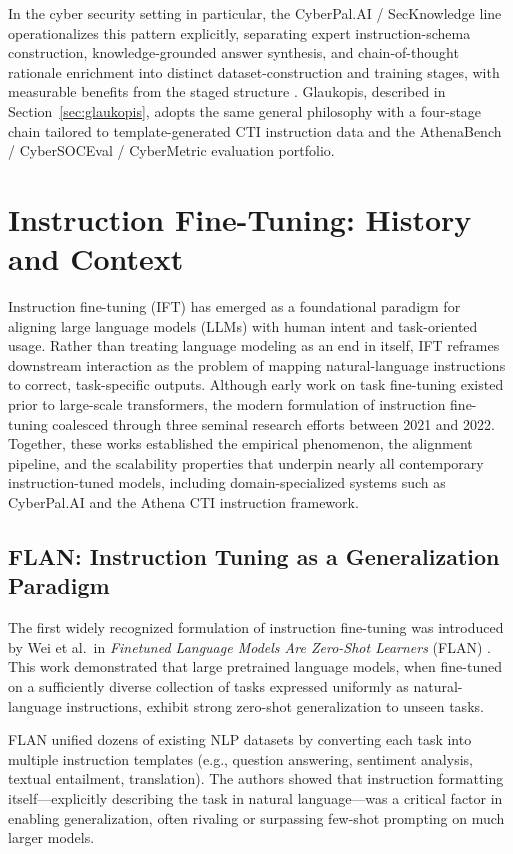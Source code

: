 \documentclass[unnumsec,webpdf,contemporary,large]{oup-authoring-template}
\theoremstyle{thmstyleone}
\theoremstyle{thmstyletwo}
\theoremstyle{thmstylethree}
\begin{document}
In the cyber security setting in particular, the CyberPal.AI / SecKnowledge line operationalizes this pattern explicitly, separating expert instruction-schema construction, knowledge-grounded answer synthesis, and chain-of-thought rationale enrichment into distinct dataset-construction and training stages, with measurable benefits from the staged structure \cite{levi2024cyberpal,levi2025toward}. Glaukopis, described in Section~\ref{sec:glaukopis}, adopts the same general philosophy with a four-stage chain tailored to template-generated CTI instruction data and the AthenaBench / CyberSOCEval / CyberMetric evaluation portfolio.


\section{Instruction Fine-Tuning: History and Context}
\label{sec:ift-history}

Instruction fine-tuning (IFT) has emerged as a foundational paradigm for aligning large language models (LLMs) with human intent and task-oriented usage. Rather than treating language modeling as an end in itself, IFT reframes downstream interaction as the problem of mapping natural-language instructions to correct, task-specific outputs. Although early work on task fine-tuning existed prior to large-scale transformers, the modern formulation of instruction fine-tuning coalesced through three seminal research efforts between 2021 and 2022. Together, these works established the empirical phenomenon, the alignment pipeline, and the scalability properties that underpin nearly all contemporary instruction-tuned models, including domain-specialized systems such as CyberPal.AI and the Athena CTI instruction framework.

\subsection{FLAN: Instruction Tuning as a Generalization Paradigm}

The first widely recognized formulation of instruction fine-tuning was introduced by Wei et al.\ in \emph{Finetuned Language Models Are Zero-Shot Learners} (FLAN) \cite{wei2022flan}. This work demonstrated that large pretrained language models, when fine-tuned on a sufficiently diverse collection of tasks expressed uniformly as natural-language instructions, exhibit strong zero-shot generalization to unseen tasks.

FLAN unified dozens of existing NLP datasets by converting each task into multiple instruction templates (e.g., question answering, sentiment analysis, textual entailment, translation). The authors showed that instruction formatting itself---explicitly describing the task in natural language---was a critical factor in enabling generalization, often rivaling or surpassing few-shot prompting on much larger models.
\end{document}
